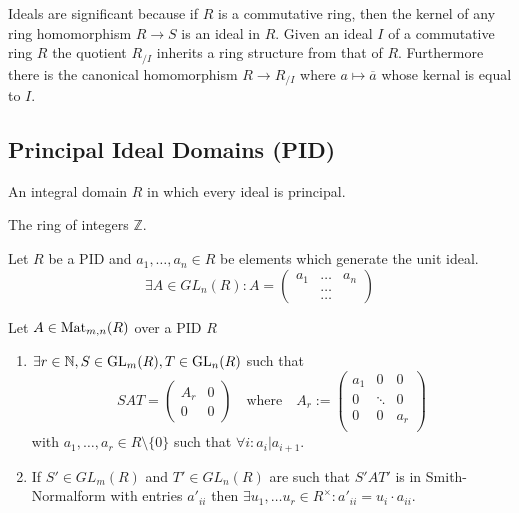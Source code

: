 Ideals are significant because if \(R\) is a commutative ring, then the kernel of any ring homomorphism \(R \to S\) is an ideal in \(R\).
Given an ideal \(I\) of a commutative ring \(R\) the quotient \(R_{/I}\) inherits a ring structure from that of \(R\).
Furthermore there is the canonical homomorphism \(R \to R_{/I}\) where \(a \mapsto \overline{a}\) whose kernal is equal to \(I\).

\subsection{Principal Ideal Domains (PID)}
\begin{definition}
   An integral domain \(R\) in which every ideal is principal.
\end{definition}
\begin{example}
   The ring of integers \(\mathbb{Z}\).
\end{example}

\begin{lemma}
   Let \(R\) be a PID and \(a_1, \ldots, a_n \in R\) be elements which generate the unit ideal.
   \[\exists A \in GL_n(R): A = \begin{pmatrix}a_1 & \ldots & a_n\\ & \ldots & \\ & \ldots & \end{pmatrix}\]
\end{lemma}

\begin{theorem}
   Let \(A \in \operatorname{Mat}_{m,n}(R)\) over a PID \(R\)
   \begin{enumerate}[label=\roman*, align=Center]
      \item \(\exists r \in \mathbb{N}, S \in \operatorname{GL}_m(R), T \in \operatorname{GL}_n(R)\) such that
         \[SAT = \left(\begin{array}{c|c} A_r & 0\\ \hline 0 & 0 \end{array}\right) \quad\text{where}\quad
            A_r := \begin{pmatrix}
               a_1 & 0      & 0 \\
               0   & \ddots & 0 \\
               0   & 0      & a_r \\
         \end{pmatrix}\]
         with \(a_1, \ldots, a_r \in R \setminus \{0\}\) such that \(\forall i: a_i | a_{i+1}\).
      \item  If \(S' \in GL_m(R)\) and \(T' \in GL_n(R)\) are such that \(S'AT'\) is in Smith-Normalform with entries \(a'_{ii}\) then \(\exists u_1, \ldots u_r \in R^\times: a'_{ii} = u_i \cdot a_{ii}\).
   \end{enumerate}
\end{theorem}

